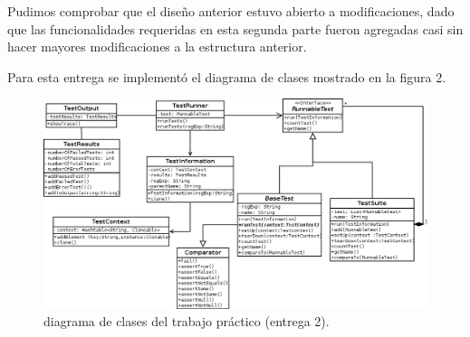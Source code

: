 \documentclass[12pt]{article}
\begin{document}
Pudimos comprobar que el diseño anterior estuvo abierto a modificaciones, dado que
las funcionalidades requeridas en esta segunda parte fueron agregadas casi sin
hacer mayores modificaciones a la estructura anterior.

Para esta entrega se implementó el diagrama de clases mostrado en la figura 2.

\begin{figure}[h!]
\begin{center}
	\includegraphics[scale=0.50,angle=90]{./ClassDiagram2}
\end{center}
	\caption{diagrama de clases del trabajo práctico (entrega 2).}
\end{figure}
\end{document}
